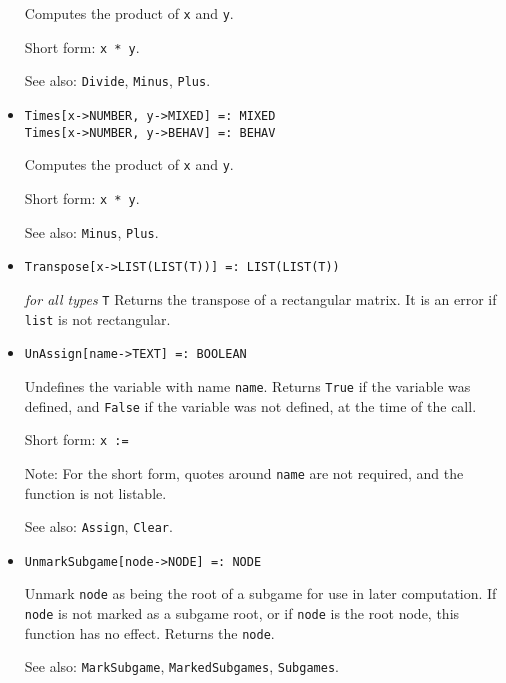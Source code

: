 \begin{itemize}
\bd
Computes the product of \verb+x+ and \verb+y+.
\item [Short form:] \verb+x * y+.
\item [See also:] \verb+Divide+, \verb+Minus+, \verb+Plus+.
\ed

\item{}
\protect \large \begin{verbatim}
Times[x->NUMBER, y->MIXED] =: MIXED 
Times[x->NUMBER, y->BEHAV] =: BEHAV 
\end{verbatim} \normalsize

\bd
Computes the product of \verb+x+ and \verb+y+.
\item [Short form:] \verb+x * y+.
\item [See also:] \verb+Minus+, \verb+Plus+.
\ed

\item{}
\protect \large \begin{verbatim} 
Transpose[x->LIST(LIST(T))] =: LIST(LIST(T)) 
\end{verbatim}\normalsize

{\it for all types} {\tt T}
\bd
Returns the transpose of a rectangular matrix.  It is an error if \verb+list+
is not rectangular.
\ed



\item{}
\protect \large \begin{verbatim}
UnAssign[name->TEXT] =: BOOLEAN
\end{verbatim}\normalsize

\bd
Undefines the variable with name \verb+name+.  Returns 
\verb+True+ if the variable was defined, and \verb+False+ if the
variable was not defined, at the time of the call.
\item [Short form:] \verb+x := +
\item [Note:] For the short form, quotes around \verb+name+ are not
required, and the function is not listable.
\item [See also:] \verb+Assign+, \verb+Clear+.
\ed

\item{}
\protect \large \begin{verbatim}
UnmarkSubgame[node->NODE] =: NODE 
\end{verbatim}\normalsize

\bd
Unmark \verb+node+ as being the root of a subgame for use in later
computation.  If \verb+node+ is not marked as a subgame root, or if
\verb+node+ is the root node, this function has no effect.  Returns
the \verb+node+.
\item [See also:] \verb+MarkSubgame+, \verb+MarkedSubgames+,
\verb+Subgames+.
\ed



\end{itemize}
